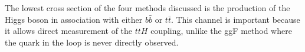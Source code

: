 The lowest cross section of the four methods discussed is the
production of the Higgs boson in association with either $b\bar{b}$ or
$t\bar{t}$.  This channel is important because it allows direct measurement of
the $ttH$ coupling, unlike the ggF method where the quark in the loop is never
directly observed.
